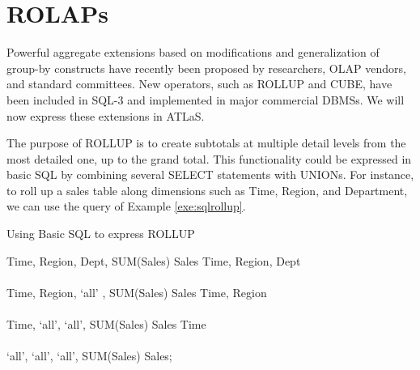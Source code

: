 {%

\section{ROLAPs}

Powerful aggregate extensions based on modifications and
generalization of group-by constructs have recently been proposed by
researchers, OLAP vendors, and standard committees. New operators,
such as %
{\cw ROLLUP} and {\cw CUBE}, have been included in SQL-3 and
implemented in major
commercial DBMSs.
We will now express these extensions
in ATLaS.

The purpose of {\cw ROLLUP} is to create subtotals at multiple
detail levels from the most detailed one, up to the grand total. This
functionality could  be expressed in basic SQL
by combining several {\cw SELECT}
statements with {\cw UNION}s. For instance, to roll up a sales table
along dimensions such as Time, Region, and Department, we can use the
query of Example \ref{exe:sqlrollup}.

{\small
\begin{example}{Using Basic SQL to express ROLLUP}
\begin{codedisplay}
 Time, Region, Dept, SUM(Sales)  Sales  Time, Region, Dept\\
\>\>\>\>\\
 Time, Region, `all' , SUM(Sales)  Sales  Time, Region\\
\>\>\>\>\\
  Time, `all', `all', SUM(Sales)  Sales  Time\\
\>\>\>\>\\
 `all', `all', `all', SUM(Sales)  Sales;
\end{codedisplay}
\label{exe:sqlrollup}
\end{example}
}

}
